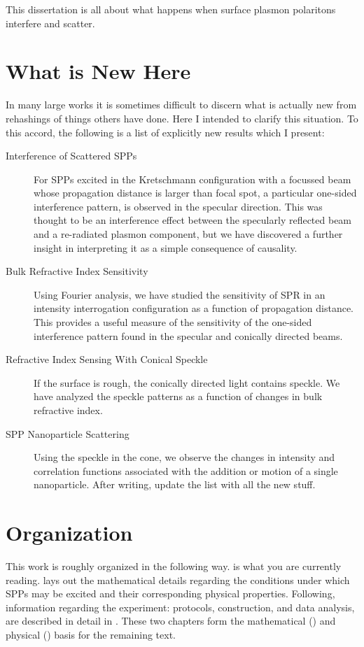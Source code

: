 This dissertation is all about what happens when surface plasmon polaritons
interfere and scatter.

\section{What is New Here}
In many large works it is sometimes difficult to discern what is actually
new from rehashings of things others have done.  Here I intended to clarify
this situation.  To this accord, the following is a list of explicitly new
results which I present:

\begin{description}
\item[{Interference of Scattered SPPs}]
For SPPs excited in the Kretschmann configuration with a focussed beam
whose propagation distance is larger than focal spot, a particular one-sided
interference pattern, is observed in the specular direction.  This was
thought to be an interference effect between the specularly reflected beam
and a re-radiated plasmon component, but we have discovered a further
insight in interpreting it as a simple consequence of causality.
\item[{Bulk Refractive Index Sensitivity}] 
Using Fourier analysis, we have studied the sensitivity of SPR in an intensity
interrogation configuration as a function of propagation distance.  This
provides a useful measure of the sensitivity of the one-sided interference
pattern found in the specular and conically directed beams.
\item[{Refractive Index Sensing With Conical Speckle}]
If the surface is rough, the conically directed light contains speckle.  We
have analyzed the speckle patterns as a function of changes in bulk
refractive index.
\item[{SPP Nanoparticle Scattering}]
Using the speckle in the cone, we observe the changes in intensity and
correlation functions associated with the addition or motion of a single
nanoparticle.
After writing, update the list with all the new stuff.
\end{description}

\section{Organization}
This work is roughly organized in the following way.  
is what you are currently reading.   lays out the
mathematical details regarding the conditions under which SPPs may be
excited and their corresponding physical properties.  Following,
information regarding the experiment: protocols, construction, and data
analysis, are described in detail in .  These two
chapters form the mathematical () and physical
() basis for the remaining text.

